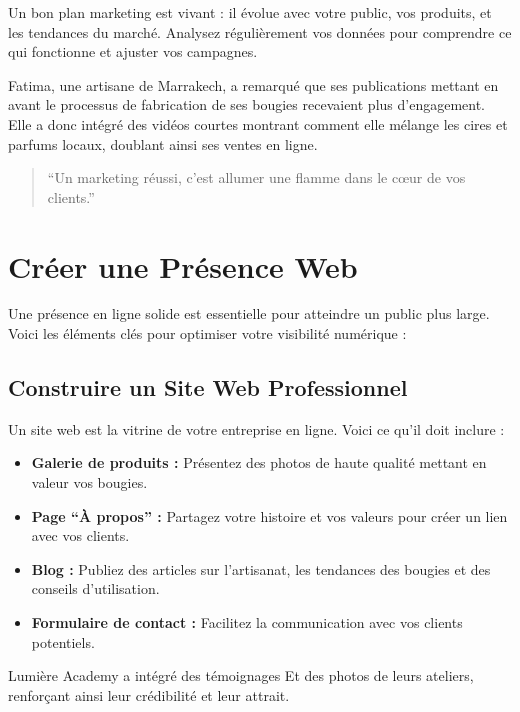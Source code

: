 \documentclass[11pt,fleqn,onecolumn,oneside]{book}
\begin{document}
Un bon plan marketing est vivant : il évolue avec votre public, vos produits, et les tendances du marché. Analysez régulièrement vos données pour comprendre ce qui fonctionne et ajuster vos campagnes.

\begin{example}
Fatima, une artisane de Marrakech, a remarqué que ses publications mettant en avant le processus de fabrication de ses bougies recevaient plus d’engagement. Elle a donc intégré des vidéos courtes montrant comment elle mélange les cires et parfums locaux, doublant ainsi ses ventes en ligne.
\end{example}

\begin{quote}
``Un marketing réussi, c’est allumer une flamme dans le cœur de vos clients.'' 
\end{quote}

\section{Créer une Présence Web}

Une présence en ligne solide est essentielle pour atteindre un public plus large. Voici les éléments clés pour optimiser votre visibilité numérique :

\subsection*{Construire un Site Web Professionnel}

Un site web est la vitrine de votre entreprise en ligne. Voici ce qu’il doit inclure :
\begin{itemize}
    \item \textbf{Galerie de produits :} Présentez des photos de haute qualité mettant en valeur vos bougies.
    \item \textbf{Page ``À propos'' :} Partagez votre histoire et vos valeurs pour créer un lien avec vos clients.
    \item \textbf{Blog :} Publiez des articles sur l’artisanat, les tendances des bougies et des conseils d’utilisation.
    \item \textbf{Formulaire de contact :} Facilitez la communication avec vos clients potentiels.
\end{itemize}

\begin{example}
Lumière Academy a intégré des témoignages Et des photos de leurs ateliers, renforçant ainsi leur crédibilité et leur attrait.
\end{example}
\end{document}
